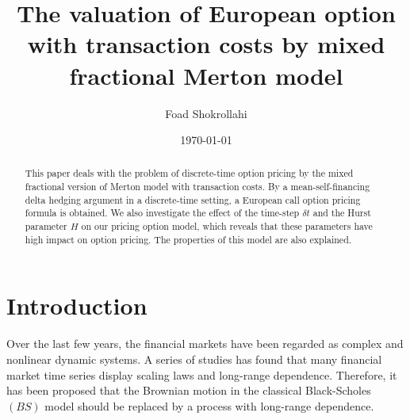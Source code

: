 \documentclass[a4paper,11pt]{amsart}
\numberwithin{equation}{section}
\theoremstyle{definition}
\theoremstyle{plain}
\theoremstyle{definition}
\newcommand{\1}{\mathbf{1}}
\begin{document}
\title[mixed fractional Merton model]
{The valuation of European option with transaction costs by mixed fractional Merton model}

\date{\today}

\author[Shokrollahi]{Foad Shokrollahi}
\address{Department of Mathematics and Statistics, University of Vaasa, P.O. Box 700, FIN-65101 Vaasa, FINLAND}






\begin{abstract}
This paper deals with the problem of discrete-time option pricing by the mixed
fractional version of Merton model with transaction costs. By a mean-self-financing delta hedging
argument in a discrete-time setting, a European call option pricing formula is obtained.
We also investigate the effect of the time-step $\delta t$ and the Hurst parameter $H$ on our pricing option model, which reveals that these parameters have high impact on option pricing. The properties of this model are also explained.
\end{abstract}


\maketitle


\section{Introduction}\label{sec:1}
Over the last few years, the financial markets have been regarded as complex and nonlinear dynamic systems. A series of studies has found that many financial market time series display scaling laws and long-range dependence. Therefore, it has been proposed that the Brownian motion in the classical Black-Scholes $(BS)$ model \cite{black} should be replaced by a process with long-range dependence.
\end{document}
